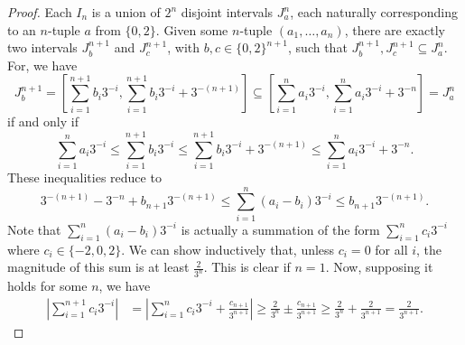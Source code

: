 \documentclass[10pt]{article}
\begin{document}
\begin{enumerate}
\begin{proof}
\begin{comment}
\begin{align*}
\frac{I_n}{3} \cup \left(\frac23 + \frac{I_n}{3}\right) &=
\bigcup_{(a_i) \in \{0,2\}^n} \left[ \sum_{i=1}^n a_i 3^{-(i+1)} , \sum_{i=1}^n a_i 3^{-(i+1)} + 3^{-(n+1)} \right]
\cup \\
& \ \ \ \bigcup_{(a_i) \in \{0,2\}^n} \left[ \frac23 + \sum_{i=1}^n a_i 3^{-(i+1)} , \frac23 + \sum_{i=1}^n a_i 3^{-(i+1)} + 3^{-(n+1)} \right]
\\
&= \bigcup_{(a_i) \in \{0\} \times \{0,2\}^n} \left[ \sum_{i=1}^{n+1} a_i 3^{-i} , \sum_{i=1}^{n+1} a_i 3^{-i} + 3^{-(n+1)} \right]
\cup \\
& \ \ \ \bigcup_{(a_i) \in \{2\} \times \{0,2\}^n} \left[ \sum_{i=1}^{n+1} a_i 3^{-i} , \sum_{i=1}^{n+1} a_i 3^{-i} + 3^{-(n+1)} \right]
\\
&= \bigcup_{(a_i) \in \{0,2\}^{n+1}} \left[ \sum_{i=1}^{n+1} a_i 3^{-i} , \sum_{i=1}^{n+1} a_i 3^{-i} + 3^{-(n+1)} \right]
\\
&= I_{n+1}
\end{align*}

\end{comment}
Each $I_n$ is a union of $2^n$ disjoint intervals $J_a^n$, each naturally corresponding to an $n$-tuple $a$ from $\{0,2\}$.  Given some $n$-tuple $(a_1, \dots , a_n)$, there are exactly two intervals $J_b^{n+1}$ and $J_c^{n+1}$, with $b,c \in \{0,2\}^{n+1}$, such that $J_b^{n+1}, J_c^{n+1} \subseteq J_a^n$.  For, we have
$$
J_b^{n+1} = \left[ \sum_{i=1}^{n+1} b_i 3^{-i} , \sum_{i=1}^{n+1} b_i 3^{-i} + 3^{-(n+1)} \right]
\subseteq
\left[ \sum_{i=1}^n a_i 3^{-i} , \sum_{i=1}^n a_i 3^{-i} + 3^{-n} \right] = J_a^n
$$
if and only if
$$
\sum_{i=1}^n a_i 3^{-i} \leq
\sum_{i=1}^{n+1} b_i 3^{-i} \leq 
\sum_{i=1}^{n+1} b_i 3^{-i} + 3^{-(n+1)} \leq \sum_{i=1}^n a_i 3^{-i} + 3^{-n}.
$$
These inequalities reduce to
$$
3^{-(n+1)} - 3^{-n} + b_{n+1}3^{-(n+1)} \leq \sum_{i=1}^n (a_i - b_i)3^{-i} \leq b_{n+1}3^{-(n+1)}.
$$
Note that $\sum_{i=1}^n (a_i - b_i)3^{-i}$ is actually a summation of the form $\sum_{i=1}^n c_i 3^{-i}$ where $c_i \in \{-2,0,2\}$.  We can show inductively that, unless $c_i = 0$ for all $i$, the magnitude of this sum is at least $\frac{2}{3^n}$.  This is clear if $n=1$.  Now, supposing it holds for some $n$, we have
\begin{align*}
\left| \sum_{i=1}^{n+1} c_i 3^{-i} \right| &=
\left| \sum_{i=1}^n c_i 3^{-i} + \frac{c_{n+1}}{3^{n+1}} \right| \geq \frac{2}{3^n} \pm \frac{c_{n+1}}{3^{n+1}} \geq \frac{2}{3^n} + \frac{2}{3^{n+1}} = \frac{2}{3^{n+1}}.
\end{align*}


\end{proof}
\end{enumerate}
\end{document}
